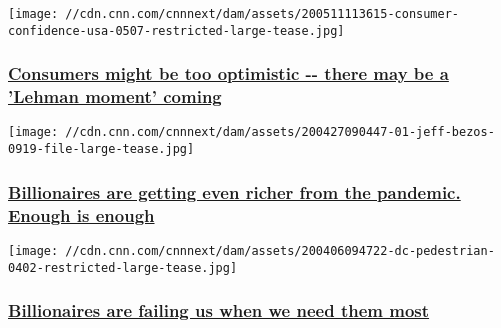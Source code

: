 \texttt{[image: //cdn.cnn.com/cnnnext/dam/assets/200511113615-consumer-confidence-usa-0507-restricted-large-tease.jpg]}

\hypertarget{consumers-might-be-too-optimistic----there-may-be-a-lehman-moment-coming}{%
\subsubsection{\texorpdfstring{\href{/2020/05/11/perspectives/consumer-confidence-coronavirus/index.html}{Consumers
might be too optimistic -\/- there may be a 'Lehman moment'
coming}}{Consumers might be too optimistic -\/- there may be a 'Lehman moment' coming}}\label{consumers-might-be-too-optimistic----there-may-be-a-lehman-moment-coming}}

\href{/2020/04/28/perspectives/inequality-coronavirus-billionaires/index.html}{}

\texttt{[image: //cdn.cnn.com/cnnnext/dam/assets/200427090447-01-jeff-bezos-0919-file-large-tease.jpg]}

\hypertarget{billionaires-are-getting-even-richer-from-the-pandemic-enough-is-enough}{%
\subsubsection{\texorpdfstring{\href{/2020/04/28/perspectives/inequality-coronavirus-billionaires/index.html}{Billionaires
are getting even richer from the pandemic. Enough is
enough}}{Billionaires are getting even richer from the pandemic. Enough is enough}}\label{billionaires-are-getting-even-richer-from-the-pandemic-enough-is-enough}}

\href{/2020/04/06/perspectives/billionaires-coronavirus/index.html}{}

\texttt{[image: //cdn.cnn.com/cnnnext/dam/assets/200406094722-dc-pedestrian-0402-restricted-large-tease.jpg]}

\hypertarget{billionaires-are-failing-us-when-we-need-them-most}{%
\subsubsection{\texorpdfstring{\href{/2020/04/06/perspectives/billionaires-coronavirus/index.html}{Billionaires
are failing us when we need them
most}}{Billionaires are failing us when we need them most}}\label{billionaires-are-failing-us-when-we-need-them-most}}

\href{/2020/05/11/perspectives/work-after-coronavirus-pandemic/index.html}{}

